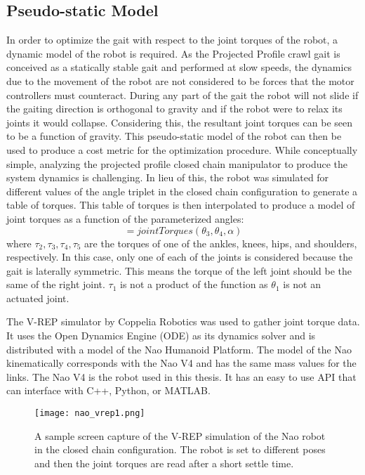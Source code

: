 \subsection{Pseudo-static Model}

In order to optimize the gait with respect to the joint torques of the robot, a dynamic model of the robot is required.
As the Projected Profile crawl gait is conceived as a statically stable gait and performed at slow speeds,
the dynamics due to the movement of the robot are not considered to be forces that the 
motor controllers must counteract. 
During any part of the gait the robot will not slide if the gaiting direction is orthogonal to gravity and
if the robot were to relax its joints it would collapse.
Considering this, the resultant joint torques can be seen to be a function of gravity. 
This pseudo-static model of the robot can then be used to produce a cost metric for the optimization procedure.
While conceptually simple, analyzing the projected profile closed chain manipulator to produce the 
system dynamics is challenging.
In lieu of this, the robot was simulated for different values of the angle triplet in the closed chain 
configuration to generate a table of torques. This table of torques is then interpolated to produce
a model of joint torques as a function of the parameterized angles:
\begin{equation}
	[\tau_2, \tau_2, \tau_4, \tau_5] = jointTorques(\theta_3, \theta_4, \alpha)
\end{equation}
where $\tau_2, \tau_3, \tau_4, \tau_5$ are the torques of one of the ankles, knees, hips, and shoulders, respectively.
In this case, only one of each of the joints is considered because the gait is laterally symmetric. This means
the torque of the left joint should be the same of the right joint.
$\tau_1$ is not a product of the function as $\theta_1$ is not an actuated joint.

The V-REP simulator by Coppelia Robotics was used to gather joint torque data. It uses the Open Dynamics Engine (ODE)
as its dynamics solver and is distributed with a model of the Nao Humanoid Platform. The model of the Nao
kinematically corresponds with the Nao V4 and has the same mass values for the links. 
The Nao V4 is the robot used in this thesis.
It has an easy to use API that can interface with C++, Python, or MATLAB.

\begin{figure}
	\texttt{[image: nao\_vrep1.png]}
  	\caption{ A sample screen capture of the V-REP simulation of the Nao robot in the closed
  				chain configuration. The robot is set to different poses and then the joint torques
  				are read after a short settle time.
  			}
  	\label{fig:nao_vrep1}
\end{figure}

